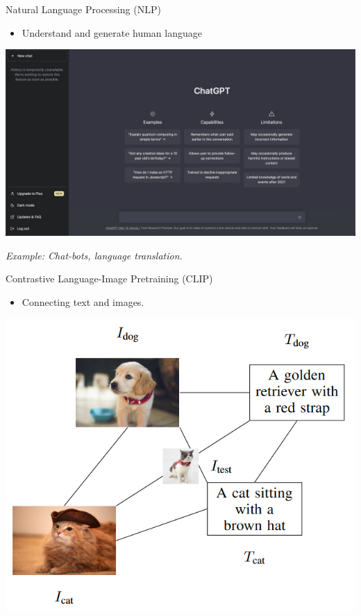 \documentclass[serif, aspectratio=169]{beamer}
\begin{document}
\begin{frame}{Natural Language Processing (NLP)}
    \begin{itemize}
        \item Understand and generate human language
    \end{itemize}
    \vspace{0.5cm}
    \begin{center}
        \includegraphics[width=0.6\linewidth]{pic/be5.jpg}
    \end{center}
    \begin{center}
        \textit{Example: Chat-bots, language translation.}
    \end{center}
\end{frame}

\begin{frame}{Contrastive Language-Image Pretraining (CLIP)}
    \begin{itemize}
        \item Connecting text and images.
    \end{itemize}
    \vspace{0.5cm}
    \begin{center}
        \includegraphics[width=0.45\linewidth]{pic/be6.png}
    \end{center}
    \vfill
\end{frame}
\end{document}
